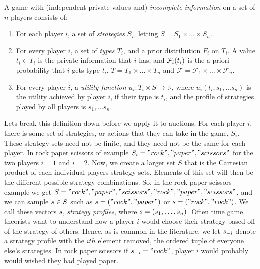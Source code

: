 \documentclass[12pt,twoside]{reedthesis}
\begin{document}
\begin{dfn}
	A game with (independent private values and) \textit{incomplete information} on a set of $n$ players consists of:
	\begin{enumerate}
		\item For each player $i$, a set of {\em strategies} $S_i$, letting $S = S_1 \times \ldots \times S_n$.
		\item For every player $i$, a set of {\em types $T_i$}, and a prior distribution $F_i$ on $T_i$. A value $t_i \in T_i$ is the private information that $i$ has, and $\mathcal{F}_i(t_i)$ is the a priori probability that $i$ gets type $t_i$. $T = T_1 \times \ldots \times T_n$ and $\mathcal{F} = \mathcal{F}_1 \times \ldots \times \mathcal{F}_n$.
		\item For every player $i$, a \textit{utility function} $u_i : T_i \times S \rightarrow \mathbb{R}$, where $u_i(t_i, s_1, \ldots s_n)$ is the utility achieved by player $i$, if their type is $t_i$, and the profile of strategies played by all players is $s_1, \ldots s_n$.
	\end{enumerate} 
\label{dfn:BayesianGame}
\end{dfn}

Lets break this definition down before we apply it to auctions. For each player $i$, there is some set of strategies, or actions that they can take in the game, $S_i$. These strategy sets need not be finite, and they need not be the same for each player. In rock paper scissors of example $S_i = {"rock", "paper", "scissors"}$ for the two players $i =1$ and $i = 2$. Now, we create a larger set $S$ that is the Cartesian product of each individual players strategy sets. Elements of this set will then be the different possible strategy combinations. So, in the rock paper scissors example we get $S = {{"rock", "paper", "scissors"},{"rock", "paper", "scissors"}}$, and we can sample $\boldmath{s} \in S$ such as $\boldmath{s} = ("rock", "paper")$ or $\boldmath{s} = ("rock", "rock")$. We call these vectors $\boldmath{s}$, {\em strategy profiles}, where $\boldmath{s} = (s_1, \ldots, s_n)$. Often time game theorists want to understand how a player $i$ would choose their strategy based off of the strategy of others. Hence, as is common in the literature, we let $\boldmath{s}_{-i}$ denote a strategy profile with the $ith$ element removed, the ordered tuple of everyone else's strategies. In rock paper scissors if $s_{-i} = {"rock"}$, player $i$ would probably would wished they had played paper.
\end{document}
